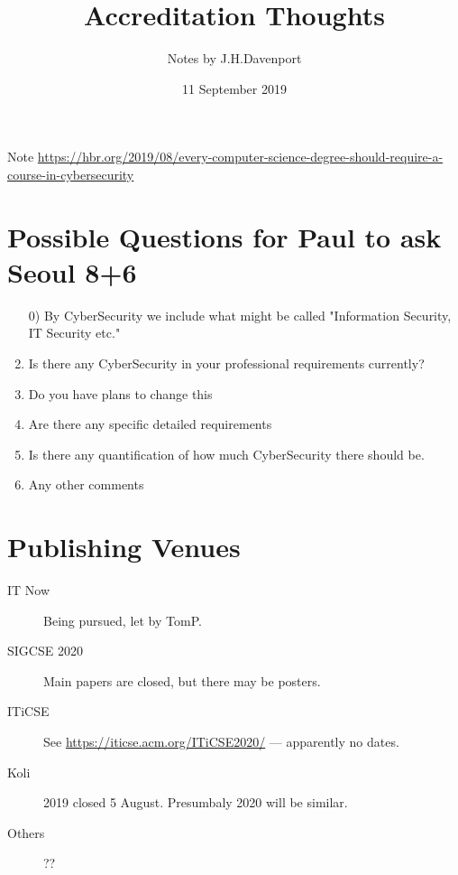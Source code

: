 \documentclass{article}
\begin{document}
\author{Notes by J.H.Davenport}
\title{Accreditation Thoughts}
\date{11 September 2019}
\maketitle
Note \url{https://hbr.org/2019/08/every-computer-science-degree-should-require-a-course-in-cybersecurity}
\section{Possible Questions for Paul to ask Seoul 8+6}
\begin{enumerate}
\item[0)]By CyberSecurity we include what might be called "Information Security, IT Security etc."
\item Is there any CyberSecurity in your professional requirements currently?
\item  Do you have plans to change this
\item Are there any specific detailed requirements
\item Is there any quantification of how much CyberSecurity there should be.
\item Any other comments
\end{enumerate}

\section{Publishing Venues}
\begin{description}
\item[IT Now]Being pursued, let by TomP.
\item[SIGCSE 2020]Main papers are closed, but there may be posters.
\item[ITiCSE]See \url{https://iticse.acm.org/ITiCSE2020/} --- apparently no dates.
\item[Koli]2019 closed 5 August. Presumbaly 2020 will be similar.
\item[Others]??
\end{description}
\end{document}
